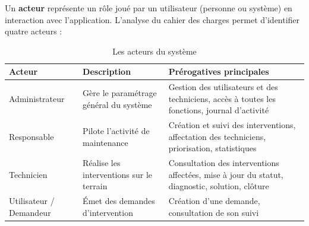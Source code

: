 \documentclass[11pt,a4paper]{report}
\begin{document}
Un \textbf{acteur} représente un rôle joué par un utilisateur (personne ou système) en interaction avec l'application. L'analyse du cahier des charges permet d'identifier quatre acteurs :
\begin{table}[htbp]\centering\small
\begin{tabularx}{\textwidth}{|X|X|X|}
\hline\rowcolor{hdr}\textbf{Acteur} & \textbf{Description} & \textbf{Prérogatives principales}\\ \hline
Administrateur & Gère le paramétrage général du système & Gestion des utilisateurs et des techniciens, accès à toutes les fonctions, journal d'activité\\ \hline
Responsable & Pilote l'activité de maintenance & Création et suivi des interventions, affectation des techniciens, priorisation, statistiques\\ \hline
Technicien & Réalise les interventions sur le terrain & Consultation des interventions affectées, mise à jour du statut, diagnostic, solution, clôture\\ \hline
Utilisateur / Demandeur & Émet des demandes d'intervention & Création d'une demande, consultation de son suivi\\ \hline
\end{tabularx}
\caption{Les acteurs du système}
\end{table}
\end{document}
